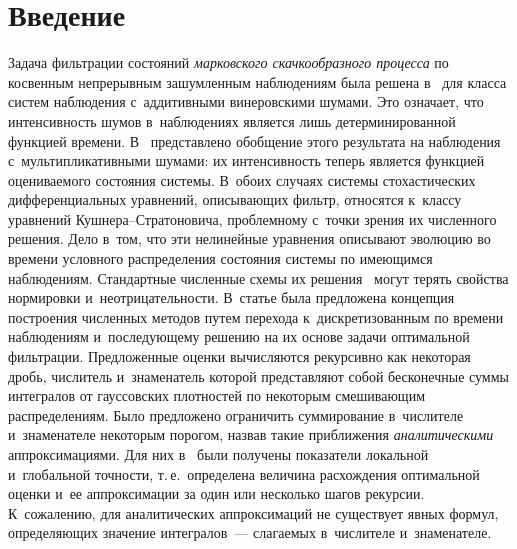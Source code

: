 
  



\thispagestyle{headings}

\begin{multicols}{2}

\label{st\stat}




 \section{Введение}
 
 Задача фильтрации состояний \textit{марковского скачкообразного процесса}  
 по косвенным непрерывным зашумленным наблюдениям была решена в~\cite{Wonham_65} для 
 класса систем наблюдения с~аддитивными винеровскими шумами. Это означает, 
 что интенсивность шумов в~наблюдениях является лишь детерминированной функцией 
 времени. В~\cite{B_18} представле\-но обобщение этого результата на наблюдения 
 с~мультипликативными шумами: их интенсивность теперь является функцией оцениваемого 
 состояния системы. В~обоих случаях системы стохастических дифференциальных уравнений, 
 опи\-сы\-ва\-ющих фильтр, относятся к~классу уравнений Куш\-не\-ра--Стра\-то\-но\-ви\-ча, 
 проблемному с~точки зрения их численного решения. Дело в~том, что эти 
 нелинейные уравнения описывают эволюцию во времени условного распределения 
 состояния сис\-те\-мы по имеющимся наблюдениям. Стандартные чис\-лен\-ные схемы их 
 решения~\cite{KP_92} могут терять свойства нормировки и~неотрицательности. 
 В~статье \cite{B_18_IA} была предложена концепция построения 
 численных методов путем перехода к~дискретизованным по времени 
 наблюдениям и~последующему решению на их основе задачи оптимальной фильтрации. 
  Предложенные оценки вычисляются рекурсивно как некоторая дробь, 
  числитель и~знаменатель которой представляют собой бесконечные суммы 
  интегралов от гауссовских плотностей по некоторым смешивающим распределениям. 
  Было предложено ограничить суммирование в~числителе и~знаменателе некоторым 
  порогом, назвав такие приближения \textit{аналитическими} аппроксимациями. 
  Для них в~\cite{B_18_IA} были получены показатели локальной и~глобальной точности,
   т.\,е.\ определена величина расхождения оптимальной оценки и~ее аппроксимации 
   за один или несколько шагов рекурсии.
К~сожалению, для аналитических аппроксимаций не существует явных формул,
 определяющих значение интегралов~--- слагаемых в~числителе и~знаменателе.


\end{multicols}
